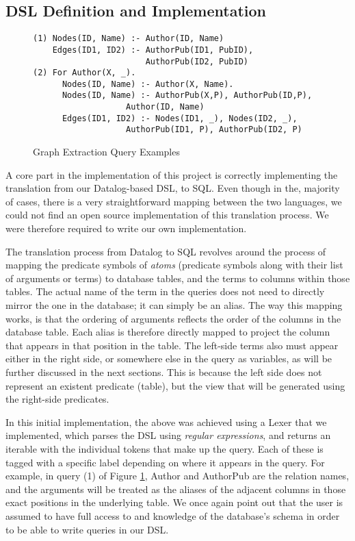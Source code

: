 \documentclass[11pt,letterpaper]{article}
\begin{document}
\subsection*{DSL Definition and Implementation}

\begin{figure}[t]
\scriptsize
\begin{lstlisting}[breaklines,basicstyle=\ttfamily]
(1) Nodes(ID, Name) :- Author(ID, Name)
    Edges(ID1, ID2) :- AuthorPub(ID1, PubID),
                       AuthorPub(ID2, PubID)
(2) For Author(X, _).
      Nodes(ID, Name) :- Author(X, Name).
      Nodes(ID, Name) :- AuthorPub(X,P), AuthorPub(ID,P),
                   Author(ID, Name)
      Edges(ID1, ID2) :- Nodes(ID1, _), Nodes(ID2, _),
                   AuthorPub(ID1, P), AuthorPub(ID2, P)
\end{lstlisting}
\vspace{-10pt}
\caption{Graph Extraction Query Examples}
\vspace{-10pt}
\label{fig:queries}
\end{figure}

A core part in the implementation of this project is correctly implementing the translation from our Datalog-based DSL, to SQL. Even though in the, majority of cases, there is a very straightforward mapping between the two languages, we could not find an open source implementation of this translation process. We were therefore required to write our own implementation.

The translation process from Datalog to SQL revolves around the process of mapping the predicate symbols of \textit{atoms} (predicate symbols along with their list of arguments or terms) to database tables, and the terms to columns within those tables. The actual name of the term in the queries does not need to directly mirror the one in the database; it can simply be an alias. The way this mapping works, is that the ordering of arguments reflects the order of the columns in the database table. Each alias is therefore directly mapped to project the column that appears in that position in the table. The left-side terms also must appear either in the right side, or somewhere else in the query as variables, as will be further discussed in the next sections. This is because the left side does not represent an existent predicate (table), but the view that will be generated using the right-side predicates.

In this initial implementation, the above was achieved using a Lexer that we implemented, which parses the DSL using \textit{regular expressions}, and returns an iterable with the individual tokens that make up the query. Each of these is tagged with a specific label depending on where it appears in the query. For example, in query (1) of Figure \ref{fig:queries}, Author and AuthorPub are the relation names, and the arguments will be treated as the aliases of the adjacent columns in those exact positions in the underlying table. We once again point out that the user is assumed to have full access to and knowledge of the database's schema in order to be able to write queries in our DSL.
\end{document}
